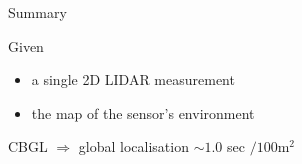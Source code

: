 \begin{frame}[noframenumbering]{Summary}

\begin{overlayarea}{\textwidth}{3cm}
\leavevmode
  Given
  \begin{itemize}
    \item a single 2D LIDAR measurement
    \item the map of the sensor's environment
  \end{itemize}

  CBGL $\Rightarrow$ global localisation $\sim 1.0$ sec $ / 100 \text{m}^2$

\end{overlayarea}
\end{frame}
